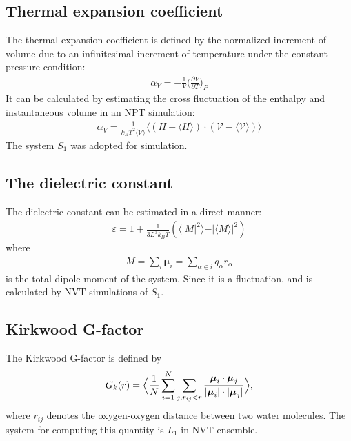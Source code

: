\documentclass[a4paper,preprint,unsortedaddress,onecolumn,fleqn]{revtex4}
\newcommand{\systemsb}{S_1}
\begin{document}
\subsection{Thermal expansion coefficient}

The thermal expansion coefficient is defined by the normalized increment of
volume due to an infinitesimal increment of temperature under the constant
pressure condition: 
\begin{align}
\alpha_V = - \frac 1V \Big(\frac{\partial V}{\partial T}\Big)_P
\end{align}
It can be calculated by estimating the cross fluctuation of the enthalpy and
instantaneous volume in an NPT simulation: 
\begin{align}
\alpha_V = \frac{1}{k_BT^2\langle \mathcal{V}\rangle} \langle (H - \langle
H\rangle)\cdot(\mathcal{V }- \langle \mathcal{V}\rangle) \rangle
\end{align}
The system $S_1$ was adopted for simulation.

\subsection{The dielectric constant}

The dielectric constant can be estimated in a direct manner: 
\begin{align}
\varepsilon = 1 + \frac{1}{3L^3 k_BT} ( \langle \vert \mathbf{\mathit{M}}%
\vert^2\rangle - \vert\langle \mathbf{\mathit{M}}\rangle\vert^2 )
\end{align}
where 
\begin{align}
\mathbf{\mathit{M }} = \sum_i\boldsymbol{\mu}_i = \sum_{\alpha\in i} q_\alpha%
\mathbf{\mathit{r}}_\alpha
\end{align}
is the total dipole moment of the system. Since it is a fluctuation, and is calculated by NVT simulations of $S_1$. 

\subsection{Kirkwood G-factor}

The Kirkwood G-factor is defined by~\cite{vanderSpoel2006origin} 
\begin{align}
G_k(r) = \Big\langle \frac 1N \sum_{i=1}^N \sum_{j, r_{ij} < r} \frac {%
\boldsymbol{\mu}_i \cdot \boldsymbol{\mu}_j}{\vert \boldsymbol{\mu}_i\vert
\cdot \vert\boldsymbol{\mu}_j\vert} \Big\rangle,
\end{align}
where $r_{ij}$ denotes the oxygen-oxygen distance between two water
molecules. The system for computing this quantity is $L_1$ in NVT ensemble.
\end{document}
